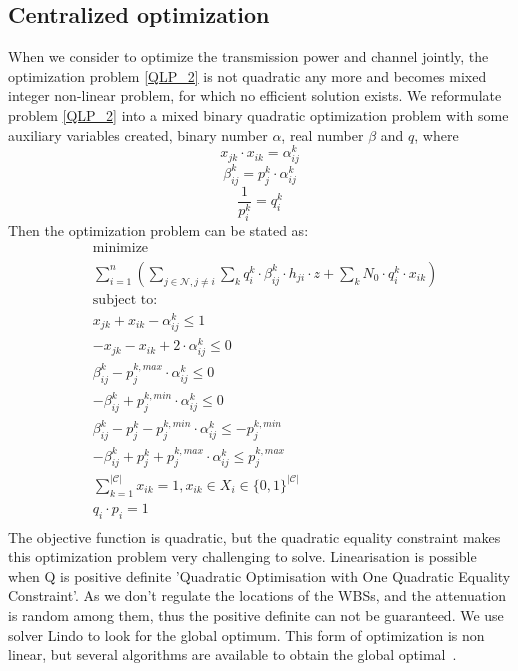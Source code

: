 \subsection{Centralized optimization}
\label{opt_channelAndPower}
When we consider to optimize the transmission power and channel jointly, the optimization problem \ref{QLP_2} is not quadratic any more and becomes mixed integer non-linear problem, for which no efficient solution exists.
We reformulate problem \ref{QLP_2} into a mixed binary quadratic optimization problem with some auxiliary variables created, \ie binary number $\alpha$, real number $\beta$ and $q$, where
	\begin{equation}
	\label{alpha_opt}
x_{jk}\cdot x_{ik} =\alpha_{ij}^k
	\end{equation}
	\begin{equation}
	\label{beta_opt}
\beta_{ij}^k = p_j^k\cdot \alpha_{ij}^k
	\end{equation}
	\begin{equation}
	\label{q_opt}	
\frac{1}{p_i^k} = q_i^k
	\end{equation}
Then the optimization problem can be stated as:
	\begin{equation}
\label{midp}
			\begin{aligned}
			& \underset{}{\text{minimize}}\\
			&\sum\limits^{n}_{i=1}(\sum\limits_{j\in\mathcal{N}, j\neq i}\sum\limits_k q_{i}^k\cdot \beta_{ij}^k \cdot h_{ji}\cdot z + \sum\limits_k N_0\cdot q_{i}^k\cdot x_{ik})\\
			& \text{subject to:} \\
			& x_{jk} + x_{ik} - \alpha_{ij}^k\leq 1 \\
			& -x_{jk} - x_{ik} +2\cdot \alpha_{ij}^k \leq 0 \\
			& \beta_{ij}^k - p_j^{k,max}\cdot \alpha_{ij}^k \leq 0 \\
			& - \beta_{ij}^k + p_j^{k,min}\cdot \alpha_{ij}^k \leq 0 \\
			& \beta_{ij}^k - p_j^k - p_j^{k,min}\cdot \alpha_{ij}^k \leq -p_j^{k,min} \\			
			& -\beta_{ij}^k + p_j^k + p_j^{k,max}\cdot \alpha_{ij}^k \leq p_j^{k,max} \\			
			& \sum\limits_{k=1}^{|\mathcal{C}|}x_{ik}=1, x_{ik}\in X_i\in \{0,1\}^{|\mathcal{C}|}\\
			& q_i\cdot p_i =1\\
			\end{aligned}
		\end{equation}
The objective function is quadratic, but the quadratic equality constraint makes this optimization problem very challenging to solve.
Linearisation is possible when Q is positive definite 'Quadratic Optimisation with One Quadratic Equality
Constraint'.
As we don't regulate the locations of the WBSs, and the attenuation is random among them, thus the positive definite can not be guaranteed.
We use solver Lindo to look for the global optimum.
This form of optimization is non linear, but several algorithms are available to obtain the global optimal~\cite{hmam2010quadratic,Quadratic_min_one_equality}.		


